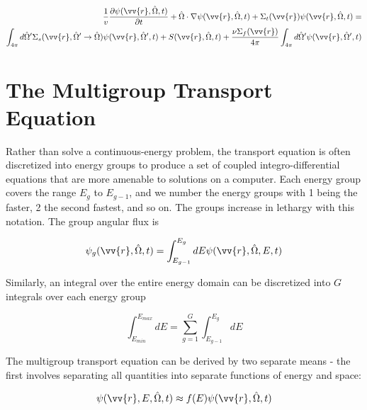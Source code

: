\documentclass[10pt]{article}
\begin{document}
\begin{flushleft}
\begin{equation}
\label{eq:TEMonoenergetic}
\begin{aligned}
\frac{1}{v} \frac{\partial\psi(\vv{r},\hat{\Omega},t)}{\partial t} +
 \hat{\Omega}\cdot\nabla\psi(\vv{r}, \hat{\Omega},t) + 
 \Sigma_t(\vv{r})\psi(\vv{r}, \hat{\Omega},t) = \\
\int_{4\pi}^{ } d\hat{\Omega}' \Sigma_s(\vv{r}, \hat{\Omega}'\rightarrow\hat{\Omega})\psi(\vv{r}, \hat{\Omega}',t) + S(\vv{r}, \hat{\Omega},t)+\frac{\nu\Sigma_f(\vv{r})}{4\pi} \int_{4\pi}^{} d\hat{\Omega}'\psi(\vv{r},\hat{\Omega}',t)\\
\end{aligned}
\end{equation}

\section{The Multigroup Transport Equation}

Rather than solve a continuous-energy problem, the transport equation is often discretized into energy groups to produce a set of coupled integro-differential equations that are more amenable to solutions on a computer. Each energy group covers the range \(E_g\) to \(E_{g-1}\), and we number the energy groups with 1 being the faster, 2 the second fastest, and so on. The groups increase in lethargy with this notation. The group angular flux is

\begin{equation}
\label{eq:GrpAngularFlux}
\psi_g (\vv{r}, \hat{\Omega},t) = \int_{E_{g-1}}^{E_g} dE \psi(\vv{r}, \hat{\Omega},E, t)
\end{equation}

Similarly, an integral over the entire energy domain can be discretized into \(G\) integrals over each energy group

\begin{equation}
\label{eq:dEMultiGroup}
\int_{E_{min}}^{E_{max}}dE = \sum_{g=1}^{G} \int_{E_{g-1}}^{E_g} dE
\end{equation}

The multigroup transport equation can be derived by two separate means - the first involves separating all quantities into separate functions of energy and space:

\begin{equation}
\label{eq:MultiGroupSeparate}
\psi(\vv{r}, E, \hat{\Omega},t) \approx f(E)\psi(\vv{r}, \hat{\Omega},t)
\end{equation}


\end{flushleft}
\end{document}
